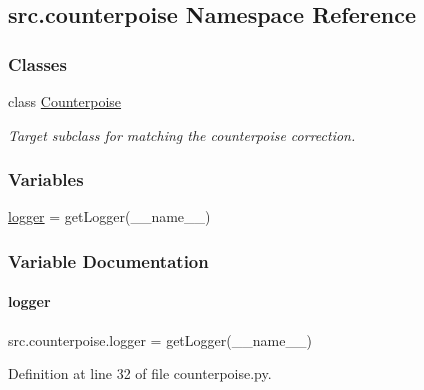 \hypertarget{namespacesrc_1_1counterpoise}{}\subsection{src.\+counterpoise Namespace Reference}
\label{namespacesrc_1_1counterpoise}
\subsubsection*{Classes}
\begin{DoxyCompactItemize}
\item 
class \hyperlink{classsrc_1_1counterpoise_1_1Counterpoise}{Counterpoise}
\begin{DoxyCompactList}\small\item\em Target subclass for matching the counterpoise correction. \end{DoxyCompactList}\end{DoxyCompactItemize}
\subsubsection*{Variables}
\begin{DoxyCompactItemize}
\item 
\hyperlink{namespacesrc_1_1counterpoise_aa8bf2010c3d19f1d6a81845b31182360}{logger} = get\+Logger(\+\_\+\+\_\+name\+\_\+\+\_\+)
\end{DoxyCompactItemize}


\subsubsection{Variable Documentation}
\mbox{\label{namespacesrc_1_1counterpoise_aa8bf2010c3d19f1d6a81845b31182360}} 
\paragraph{\texorpdfstring{logger}{logger}}
{\footnotesize\ttfamily src.\+counterpoise.\+logger = get\+Logger(\+\_\+\+\_\+name\+\_\+\+\_\+)}



Definition at line 32 of file counterpoise.\+py.


